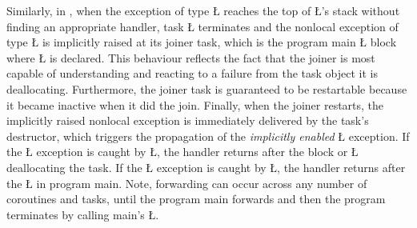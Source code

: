 \documentclass[openright,twoside]{report}
\begin{document}
Similarly, in , when the exception of type \LGinlinetrue\LGbegin\lgrinde\L{}\endlgrinde\LGend{} reaches the top of \LGinlinetrue\LGbegin\lgrinde\L{}\endlgrinde\LGend{}'s stack without finding an appropriate handler, task \LGinlinetrue\LGbegin\lgrinde\L{}\endlgrinde\LGend{} terminates and the nonlocal exception of type \LGinlinetrue\LGbegin\lgrinde\L{}\endlgrinde\LGend{} is implicitly raised at its joiner task, which is the program main \LGinlinetrue\LGbegin\lgrinde\L{}\endlgrinde\LGend{} block where \LGinlinetrue\LGbegin\lgrinde\L{}\endlgrinde\LGend{} is declared.
This behaviour reflects the fact that the joiner is most capable of understanding and reacting to a failure from the task object it is deallocating.
Furthermore, the joiner task is guaranteed to be restartable because it became inactive when it did the join.
Finally, when the joiner restarts, the implicitly raised nonlocal exception is immediately delivered by the task's destructor, which triggers the propagation of the \emph{implicitly enabled} \LGinlinetrue\LGbegin\lgrinde\L{}\endlgrinde\LGend{} exception.
If the \LGinlinetrue\LGbegin\lgrinde\L{}\endlgrinde\LGend{} exception is caught by \LGinlinetrue\LGbegin\lgrinde\L{}\endlgrinde\LGend{}, the handler returns after the block or \LGinlinetrue\LGbegin\lgrinde\L{}\endlgrinde\LGend{} deallocating the task.
If the \LGinlinetrue\LGbegin\lgrinde\L{}\endlgrinde\LGend{} exception is caught by \LGinlinetrue\LGbegin\lgrinde\L{}\endlgrinde\LGend{}, the handler returns after the \LGinlinetrue\LGbegin\lgrinde\L{}\endlgrinde\LGend{} in program main.
Note, forwarding can occur across any number of coroutines and tasks, until the program main forwards and then the program terminates by calling main's \LGinlinetrue\LGbegin\lgrinde\L{}\endlgrinde\LGend{}.
\end{document}
